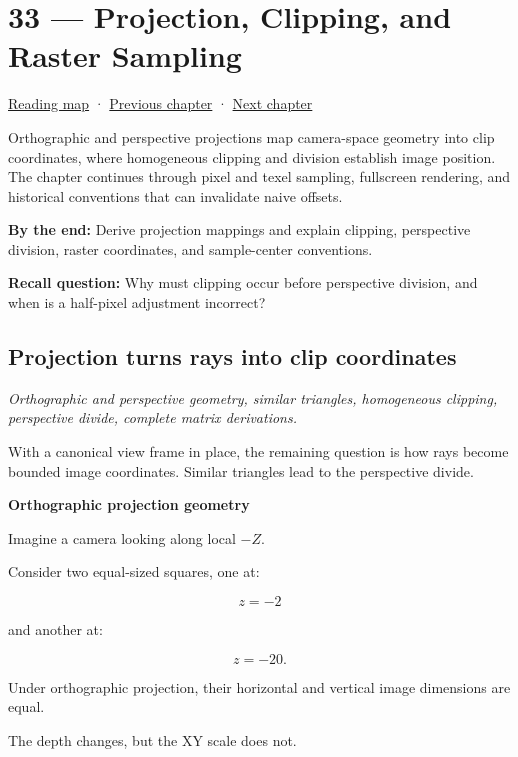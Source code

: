 \hypertarget{02-foundations-ii-ch033}{}
\section{33 --- Projection, Clipping, and Raster Sampling}\label{projection-clipping-and-raster-sampling}

\href{Chapter\%20Edition/01\%20-\%20Computing\%20Foundations/00\%20-\%20Reading\%20Map}{Reading map} · \hyperref[02-foundations-ii-ch032]{Previous chapter} · \hyperref[02-foundations-ii-ch034]{Next chapter}

Orthographic and perspective projections map camera-space geometry into clip coordinates, where homogeneous clipping and division establish image position. The chapter continues through pixel and texel sampling, fullscreen rendering, and historical conventions that can invalidate naive offsets.

\textbf{By the end:} Derive projection mappings and explain clipping, perspective division, raster coordinates, and sample-center conventions.

\textbf{Recall question:} Why must clipping occur before perspective division, and when is a half-pixel adjustment incorrect?

\subsection{Projection turns rays into clip coordinates}\label{projection-turns-rays-into-clip-coordinates}

\emph{Orthographic and perspective geometry, similar triangles, homogeneous clipping, perspective divide, complete matrix derivations.}

With a canonical view frame in place, the remaining question is how rays become bounded image coordinates. Similar triangles lead to the perspective divide.

\textbf{Orthographic projection geometry}

Imagine a camera looking along local \(-Z\).

Consider two equal-sized squares, one at:

\[
 z=-2
\]

and another at:

\[
 z=-20.
\]

Under orthographic projection, their horizontal and vertical image dimensions are equal.

The depth changes, but the XY scale does not.

